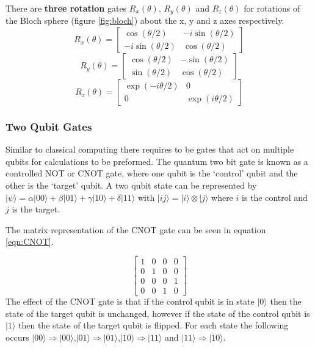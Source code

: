 There are {\bf three rotation} gates $R_x(\theta)$, $R_y(\theta)$ and $R_z(\theta)$ for rotations of the Bloch sphere (figure \ref{fig:bloch}) about the x, y and z axes respectively. 
\begin{equation}
    R_x(\theta) = \begin{bmatrix}
\cos (\theta/2) & -i \sin (\theta/2) \\
-i \sin (\theta/2) & \cos (\theta/2) 
\end{bmatrix}  
\end{equation}
\begin{equation}
    R_y(\theta) = \begin{bmatrix}
\cos (\theta/2) & - \sin (\theta/2) \\
\sin (\theta/2) & \cos (\theta/2) 
\end{bmatrix}  
\end{equation}
\begin{equation}
    R_z(\theta) = \begin{bmatrix}
\exp (-i \theta/2) & 0 \\
0 & \exp (i \theta/2) 
\end{bmatrix}  
\end{equation}


\subsubsection{Two Qubit Gates}\label{sec:twoqubit}
Similar to classical computing there requires to be gates that act on multiple qubits for calculations to be preformed. 
The quantum two bit gate is known as a controlled NOT or CNOT gate, where one qubit is the `control' qubit and the other is the `target' qubit. \cite{nielsen_quantum_2010}
A two qubit state can be represented by $|\psi\rangle = \alpha |00\rangle + \beta|01\rangle + \gamma|10\rangle + \delta |11\rangle$ with $|ij\rangle=|i\rangle \otimes |j\rangle$ where $i$ is the control and $j$ is the target. 

The matrix representation of the CNOT gate can be seen in equation \ref{eqn:CNOT}.

\begin{equation}\label{eqn:CNOT}
    \begin{bmatrix}
1 & 0 & 0 & 0 \\
0 & 1 & 0 & 0 \\
0 & 0 & 0 & 1 \\
0 & 0 & 1 & 0 
\end{bmatrix}  
\end{equation}
The effect of the CNOT gate is that if the control qubit is in state $|0\rangle$ then the state of the target qubit is unchanged, however if the state of the control qubit is $|1\rangle$ then the state of the target qubit is flipped. 
For each state the following occurs $|00\rangle \Rightarrow |00\rangle$,$ |01\rangle \Rightarrow |01\rangle$,$ |10\rangle \Rightarrow |11\rangle$ and $|11\rangle \Rightarrow |10\rangle$.


